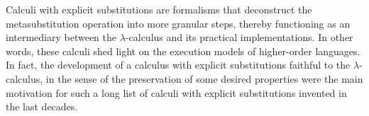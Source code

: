 Calculi with explicit substitutions are formalisms that deconstruct the metasubstitution operation into more granular steps, thereby functioning as an intermediary between the $\lambda$-calculus and its practical implementations. In other words, these calculi shed light on the execution models of higher-order languages. In fact, the development of a calculus with explicit substitutions faithful to the $\lambda$-calculus, in the sense of the preservation of some desired properties were the main motivation for such a long list of calculi with explicit substitutions invented in the last decades\cite{abadiExplicitSubstitutions1991,blooPreservationStrongNormalisation1995,benaissaLambdaUpsilonCalculus1996,curienConfluencePropertiesWeak1996,munozConfluencePreservationStrong1996,kamareddineExtendingLambdaCalculusExplicit1997,blooExplicitSubstitutionEdge1999,davidLambdacalculusExplicitWeakening2001,kesnerTheoryExplicitSubstitutions2009}.



